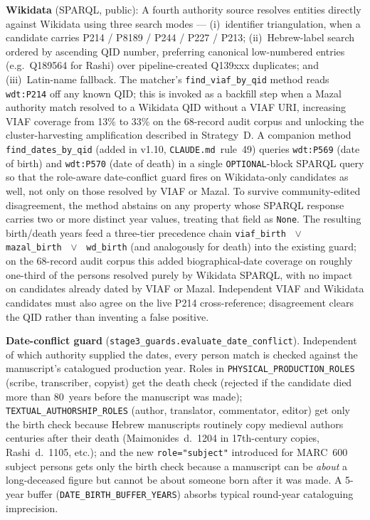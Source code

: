 \documentclass[Afour,sageh,times]{sagej}
\begin{document}
\textbf{Wikidata} (SPARQL, public): A fourth authority source resolves entities directly against Wikidata using three search modes --- (i)~identifier triangulation, when a candidate carries P214 / P8189 / P244 / P227 / P213; (ii)~Hebrew-label search ordered by ascending QID number, preferring canonical low-numbered entries (e.g.\ Q189564 for Rashi) over pipeline-created Q139xxx duplicates; and (iii)~Latin-name fallback. The matcher's \texttt{find\_viaf\_by\_qid} method reads \texttt{wdt:P214} off any known QID; this is invoked as a backfill step when a Mazal authority match resolved to a Wikidata QID without a VIAF URI, increasing VIAF coverage from 13\% to 33\% on the 68-record audit corpus and unlocking the cluster-harvesting amplification described in Strategy~D. A companion method \texttt{find\_dates\_by\_qid} (added in v1.10, \texttt{CLAUDE.md}~rule~49) queries \texttt{wdt:P569} (date of birth) and \texttt{wdt:P570} (date of death) in a single \texttt{OPTIONAL}-block SPARQL query so that the role-aware date-conflict guard fires on Wikidata-only candidates as well, not only on those resolved by VIAF or Mazal. To survive community-edited disagreement, the method abstains on any property whose SPARQL response carries two or more distinct year values, treating that field as \texttt{None}. The resulting birth/death years feed a three-tier precedence chain \texttt{viaf\_birth ${\,\vee\,}$ mazal\_birth ${\,\vee\,}$ wd\_birth} (and analogously for death) into the existing guard; on the 68-record audit corpus this added biographical-date coverage on roughly one-third of the persons resolved purely by Wikidata SPARQL, with no impact on candidates already dated by VIAF or Mazal. Independent VIAF and Wikidata candidates must also agree on the live P214 cross-reference; disagreement clears the QID rather than inventing a false positive.

\textbf{Date-conflict guard} (\texttt{stage3\_guards.evaluate\_date\_conflict}). Independent of which authority supplied the dates, every person match is checked against the manuscript's catalogued production year. Roles in \texttt{PHYSICAL\_PRODUCTION\_ROLES} (scribe, transcriber, copyist) get the death check (rejected if the candidate died more than 80~years before the manuscript was made); \texttt{TEXTUAL\_AUTHORSHIP\_ROLES} (author, translator, commentator, editor) get only the birth check because Hebrew manuscripts routinely copy medieval authors centuries after their death (Maimonides~d.~1204 in 17th-century copies, Rashi~d.~1105, etc.); and the new \texttt{role="subject"} introduced for MARC~600 subject persons gets only the birth check because a manuscript can be \emph{about} a long-deceased figure but cannot be about someone born after it was made. A 5-year buffer (\texttt{DATE\_BIRTH\_BUFFER\_YEARS}) absorbs typical round-year cataloguing imprecision.
\end{document}
